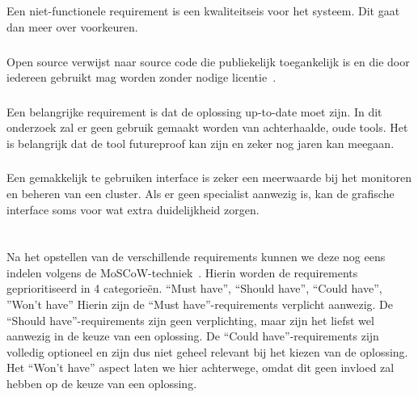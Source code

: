 \subsection{}
\label{subsec:Niet-functionele Requirements}
Een niet-functionele requirement is een kwaliteitseis voor het systeem. Dit gaat dan meer over voorkeuren.

\subsubsection{}
\label{subsubsec:Open source}
Open source verwijst naar source code die publiekelijk toegankelijk is en die door iedereen gebruikt mag worden zonder nodige licentie~\autocite{2021c}. %

\subsubsection{}
\label{subsubsec:Anno 2020-2021}
Een belangrijke requirement is dat de oplossing up-to-date moet zijn. In dit onderzoek zal er geen gebruik gemaakt worden van achterhaalde, oude tools. Het is belangrijk dat de tool futureproof kan zijn en zeker nog jaren kan meegaan.

\subsubsection{}
\label{subsubsec:Grafische interface}
Een gemakkelijk te gebruiken interface is zeker een meerwaarde bij het monitoren en beheren van een cluster. Als er geen specialist aanwezig is, kan de grafische interface soms voor wat extra duidelijkheid zorgen.


\section{}
\label{sec:Indelen requirements volgens MoSCoW-techniek}

Na het opstellen van de verschillende requirements kunnen we deze nog eens indelen volgens de MoSCoW-techniek~\autocite{Ahmad2017}. Hierin worden de requirements geprioritiseerd in 4 categorieën. “Must have”, “Should have”, “Could have”, ”Won't have” Hierin zijn de “Must have”-requirements verplicht aanwezig. De “Should have”-requirements zijn geen verplichting, maar zijn het liefst wel aanwezig in de keuze van een oplossing. De “Could have”-requirements zijn volledig optioneel en zijn dus niet geheel relevant bij het kiezen van de oplossing. Het “Won't have” aspect laten we hier achterwege, omdat dit geen invloed zal hebben op de keuze van een oplossing.

